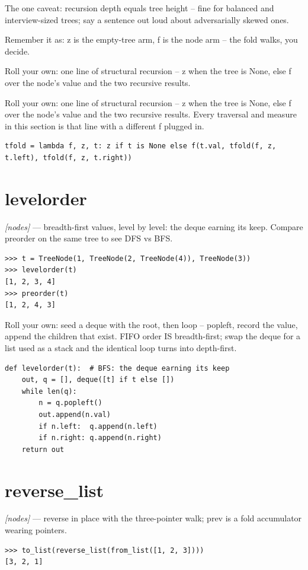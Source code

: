 \documentclass[11pt,letterpaper]{book}
\begin{document}
The one caveat: recursion depth equals tree height -- fine for balanced and interview-sized trees; say a sentence out loud about adversarially skewed ones.


Remember it as: z is the empty-tree arm, f is the node arm -- the fold walks, you decide.


Roll your own: one line of structural recursion -- z when the tree is None, else f over the node's value and the two recursive results.


Roll your own: one line of structural recursion -- z when the tree is None, else f over the node's value and the two recursive results. Every traversal and measure in this section is that line with a different f plugged in.

\begin{lstlisting}[style=code]
tfold = lambda f, z, t: z if t is None else f(t.val, tfold(f, z, t.left), tfold(f, z, t.right))
\end{lstlisting}

\section{levelorder}
\noindent\textit{[nodes]} --- breadth-first values, level by level: the deque earning its keep. Compare preorder on the same tree to see DFS vs BFS.
\begin{lstlisting}[style=spec]
>>> t = TreeNode(1, TreeNode(2, TreeNode(4)), TreeNode(3))
>>> levelorder(t)
[1, 2, 3, 4]
>>> preorder(t)
[1, 2, 4, 3]
\end{lstlisting}

Roll your own: seed a deque with the root, then loop -- popleft, record the value, append the children that exist. FIFO order IS breadth-first; swap the deque for a list used as a stack and the identical loop turns into depth-first.

\begin{lstlisting}[style=code]
def levelorder(t):  # BFS: the deque earning its keep
    out, q = [], deque([t] if t else [])
    while len(q):
        n = q.popleft()
        out.append(n.val)
        if n.left:  q.append(n.left)
        if n.right: q.append(n.right)
    return out
\end{lstlisting}

\section{reverse\_list}
\noindent\textit{[nodes]} --- reverse in place with the three-pointer walk; prev is a fold accumulator wearing pointers.
\begin{lstlisting}[style=spec]
>>> to_list(reverse_list(from_list([1, 2, 3])))
[3, 2, 1]
\end{lstlisting}
\end{document}
